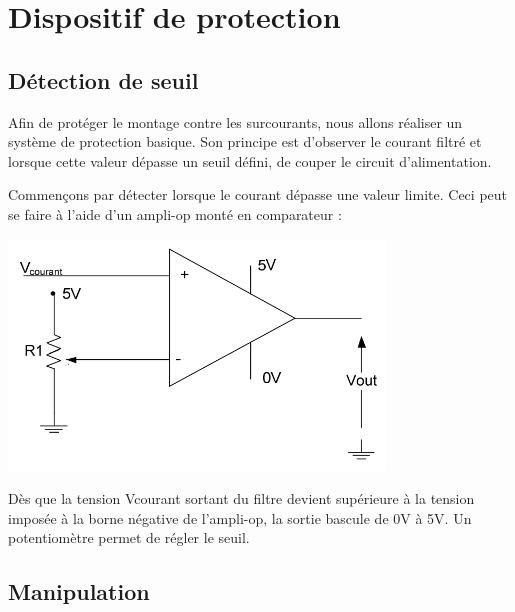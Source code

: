 \documentclass{../template/labo}
\begin{document}
\section{Dispositif de protection}
\subsection{Détection de seuil}
Afin de protéger le montage contre les surcourants, nous allons réaliser un système de protection
basique. Son principe est d'observer le courant filtré et lorsque cette valeur dépasse un seuil défini, de
couper le circuit d'alimentation.

Commençons par détecter lorsque le courant dépasse une valeur limite. Ceci peut se faire à l'aide
d'un ampli-op monté en comparateur :

\begin{center}
\includegraphics[width=10cm]{sch8}
\end{center}

Dès que la tension Vcourant sortant du filtre devient supérieure à la tension imposée à la borne négative
de l'ampli-op, la sortie bascule de 0V à 5V. Un potentiomètre permet de régler le seuil.

\subsection{Manipulation}



\end{document}
